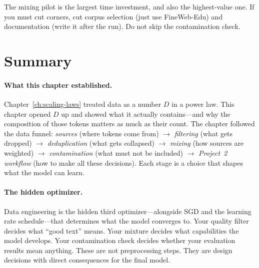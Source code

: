 The mixing pilot is the largest time investment, and also the highest-value one. If you must cut corners, cut corpus selection (just use FineWeb-Edu) and documentation (write it after the run). Do not skip the contamination check.

\noindent{}


\section*{Summary}

\paragraph{What this chapter established.} Chapter~\ref{ch:scaling-laws} treated data as a number $D$ in a power law. This chapter opened $D$ up and showed what it actually contains---and why the composition of those tokens matters as much as their count. The chapter followed the data funnel: \emph{sources} (where tokens come from) $\to$ \emph{filtering} (what gets dropped) $\to$ \emph{deduplication} (what gets collapsed) $\to$ \emph{mixing} (how sources are weighted) $\to$ \emph{contamination} (what must not be included) $\to$ \emph{Project~2 workflow} (how to make all these decisions). Each stage is a choice that shapes what the model can learn.

\paragraph{The hidden optimizer.} Data engineering is the hidden third optimizer---alongside SGD and the learning rate schedule---that determines what the model converges to. Your quality filter decides what ``good text'' means. Your mixture decides what capabilities the model develops. Your contamination check decides whether your evaluation results mean anything. These are not preprocessing steps. They are design decisions with direct consequences for the final model.

